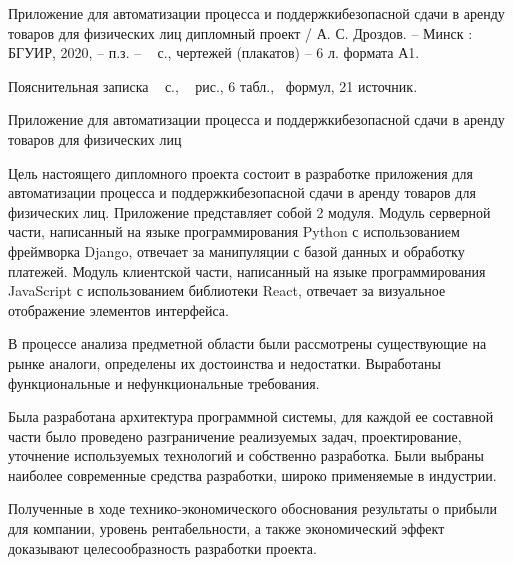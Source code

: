 \thispagestyle{empty}

Приложение для автоматизации процесса и поддержкибезопасной сдачи в аренду товаров для физических лиц дипломный проект / А. С. Дроздов. – Минск : БГУИР, 2020, – п.з. – ~\pageref*{LastPage} с., чертежей (плакатов) – 6 л. формата А1.

Пояснительная записка ~\pageref*{LastPage} с., \totfig{}~ рис., 6 табл., \toteq{}~формул, 21 источник.

Приложение для автоматизации процесса и поддержкибезопасной сдачи в аренду товаров для физических лиц

Цель настоящего дипломного проекта состоит в разработке приложения для автоматизации процесса и поддержкибезопасной сдачи в аренду товаров для физических лиц.
Приложение представляет собой 2 модуля.
Модуль серверной части, написанный на языке программирования Python с использованием фреймворка Django, отвечает за манипуляции с базой данных и обработку платежей.
Модуль клиентской части, написанный на языке программирования JavaScript с использованием библиотеки React, отвечает за визуальное отображение элементов интерфейса.

В процессе анализа предметной области были рассмотрены существующие на рынке аналоги, определены их достоинства и недостатки.
Выработаны функциональные и нефункциональные требования.

Была разработана архитектура программной системы, для каждой ее составной части было проведено разграничение реализуемых задач, проектирование, уточнение используемых технологий и собственно разработка.
Были выбраны наиболее современные средства разработки, широко применяемые в индустрии.

Полученные в ходе технико-экономического обоснования результаты о прибыли для компании, уровень рентабельности, а также экономический эффект доказывают целесообразность разработки проекта.
\pagebreak
